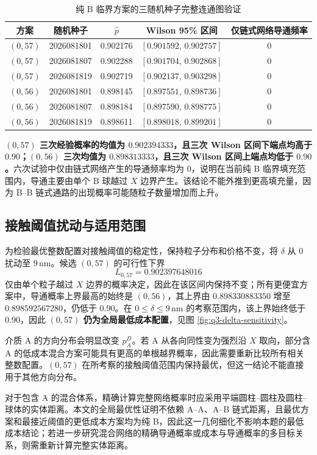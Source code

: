 \documentclass[withoutpreface,bwprint]{cumcmthesis}
\begin{document}
\begin{table}[H]
\centering
\small
\caption{纯 B 临界方案的三随机种子完整连通图验证}
\label{tab:q4-b-only-check}
\begin{tabular}{ccccc}
\toprule
方案 & 随机种子 & $\hat p$ & Wilson 95\% 区间 & 仅链式网络导通频率 \\
\midrule
$(0,57)$ & 2026081801 & 0.902176 & $[0.901592,\,0.902757]$ & 0 \\
$(0,57)$ & 2026081807 & 0.902288 & $[0.901704,\,0.902868]$ & 0 \\
$(0,57)$ & 2026081819 & 0.902719 & $[0.902137,\,0.903298]$ & 0 \\
$(0,56)$ & 2026081801 & 0.898145 & $[0.897551,\,0.898736]$ & 0 \\
$(0,56)$ & 2026081807 & 0.898184 & $[0.897590,\,0.898775]$ & 0 \\
$(0,56)$ & 2026081819 & 0.898611 & $[0.898018,\,0.899201]$ & 0 \\
\bottomrule
\end{tabular}
\end{table}

\textbf{$(0,57)$ 三次经验概率的均值为 $0.902394333$，且三次 Wilson 区间下端点均高于 $0.90$；$(0,56)$ 三次均值为 $0.898313333$，且三次 Wilson 区间上端点均低于 $0.90$。}六次试验中仅由链式网络产生的导通频率均为 0，说明在当前纯 B 临界填充范围内，导通主要由单个 B 球越过 $X$ 边界产生。该结论不能外推到更高填充量，因为 B--B 链式通路的出现概率可能随粒子数量增加而上升。

\subsection{接触阈值扰动与适用范围}

为检验最优整数配置对接触阈值的稳定性，保持粒子分布和价格不变，将 $\delta$ 从 $0$ 扰动至 $9\,\mathrm{nm}$。候选 $(0,57)$ 的可行性下界
\[
L_{0,57}=0.902397648016
\]
仅由单个粒子越过 $X$ 边界的概率决定，因此在该区间内保持不变；所有更便宜方案中，导通概率上界最高的始终是 $(0,56)$，其上界由 $0.898330883350$ 增至 $0.898592567280$，仍低于 $0.90$。在 $0\le\delta\le9\,\mathrm{nm}$ 的考察范围内，该上界始终低于 $0.90$，因此 \textbf{$(0,57)$ 仍为全局最低成本配置}，见图 \ref{fig:q3-delta-sensitivity}。

介质 A 的方向分布会明显改变 $p_A^D$。若 A 从各向同性变为强烈沿 $X$ 取向，部分含 A 的低成本混合方案可能具有更高的单根越界概率，因此需要重新比较所有相关整数配置。$(0,57)$ 在所考察的接触阈值范围内保持最优，但这一结论不能直接用于其他方向分布。

对于包含 A 的混合体系，精确计算完整网络概率时应采用平端圆柱--圆柱及圆柱--球体的实体距离。本文的全局最优性证明不依赖 A--A、A--B 链式距离，且最优方案和最接近阈值的更低成本方案均为纯 B，因此这一几何细化不影响本题的最低成本结论；若进一步研究混合网络的精确导通概率或成本与导通概率的多目标关系，则需重新计算完整实体距离。
\end{document}
